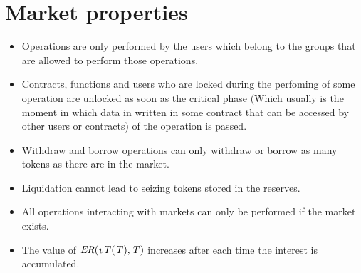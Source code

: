 \section{Market properties}

\begin{itemize}
  \item Operations are only performed by the users which belong to the groups that are allowed to perform those operations.
  \item Contracts, functions and users who are locked during the perfoming of some operation are unlocked as soon as the critical phase (Which usually is the moment in which data in written in some contract that can be accessed by other users or contracts) of the operation is passed.
  \item Withdraw and borrow operations can only withdraw or borrow as many tokens as there are in the market.
  \item Liquidation cannot lead to seizing tokens stored in the reserves.
  \item All operations interacting with markets can only be performed if the market exists.
  \item The value of $\mathit{ER(\mathit{vT(T)}, T)}$ increases after each time the interest is accumulated.
\end{itemize}
